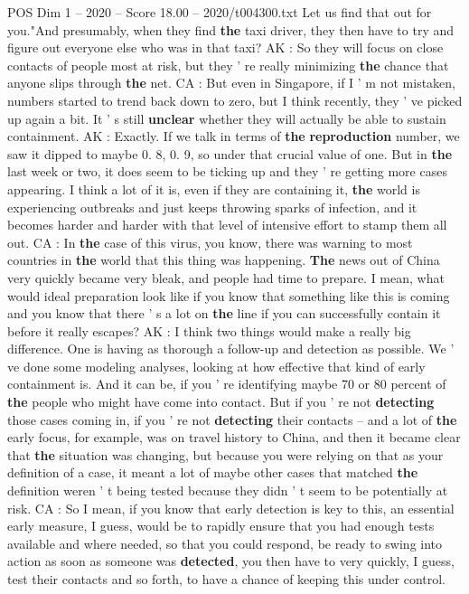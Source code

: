 \begin{textsample}{POS Dim 1 – 2020 – Score 18.00 – 2020/t004300.txt}
Let us find that out for you."And presumably, when they find \textbf{the} taxi driver, they then have to try and figure out everyone else who was in that taxi?
AK : So they will focus on close contacts of people most at risk, but they ' re really minimizing \textbf{the} chance that anyone slips through \textbf{the} net.
CA : But even in Singapore, if I ' m not mistaken, numbers started to trend back down to zero, but I think recently, they ' ve picked up again a bit.
It ' s still \textbf{unclear} whether they will actually be able to sustain containment.
AK : Exactly.
If we talk in terms of \textbf{the} \textbf{reproduction} number, we saw it dipped to maybe 0. 8, 0. 9, so under that crucial value of one.
But in \textbf{the} last week or two, it does seem to be ticking up and they ' re getting more cases appearing.
I think a lot of it is, even if they are containing it, \textbf{the} world is experiencing outbreaks and just keeps throwing sparks of infection, and it becomes harder and harder with that level of intensive effort to stamp them all out.
CA : In \textbf{the} case of this virus, you know, there was warning to most countries in \textbf{the} world that this thing was happening. \textbf{The} news out of China very quickly became very bleak, and people had time to prepare.
I mean, what would ideal preparation look like if you know that something like this is coming and you know that there ' s a lot on \textbf{the} line if you can successfully contain it before it really escapes?
AK : I think two things would make a really big difference.
One is having as thorough a follow-up and detection as possible.
We ' ve done some modeling analyses, looking at how effective that kind of early containment is.
And it can be, if you ' re identifying maybe 70 or 80 percent of \textbf{the} people who might have come into contact.
But if you ' re not \textbf{detecting} those cases coming in, if you ' re not \textbf{detecting} their contacts -- and a lot of \textbf{the} early focus, for example, was on travel history to China, and then it became clear that \textbf{the} situation was changing, but because you were relying on that as your definition of a case, it meant a lot of maybe other cases that matched \textbf{the} definition weren ' t being tested because they didn ' t seem to be potentially at risk.
CA : So I mean, if you know that early detection is key to this, an essential early measure, I guess, would be to rapidly ensure that you had enough tests available and where needed, so that you could respond, be ready to swing into action as soon as someone was \textbf{detected}, you then have to very quickly, I guess, test their contacts and so forth, to have a chance of keeping this under control.

\end{textsample}
